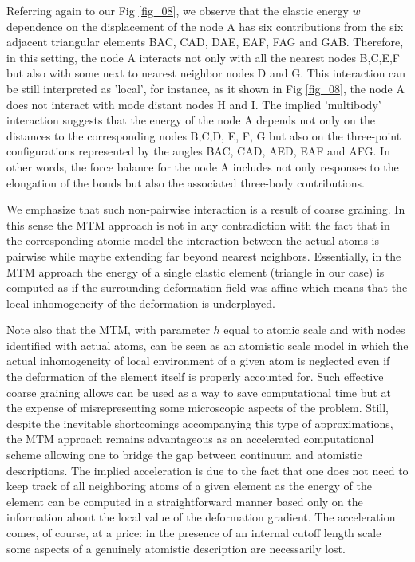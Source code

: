 \documentclass[aps,
superscriptaddress,notitlepage]{revtex4-1}
\begin{document}
Referring again to our Fig \ref{fig_08}, we observe that the elastic  energy $w$ dependence on the displacement of the node A has six contributions from the six adjacent triangular elements BAC, CAD, DAE, EAF, FAG and GAB. Therefore, in this setting,  the node A interacts  not only  with all the  nearest   nodes B,C,E,F but also with some next to nearest neighbor nodes D and G.   This interaction can be still interpreted as 'local', for instance, as it   shown in Fig \ref{fig_08},  the node A does not interact with  mode distant nodes H and I. 
 The implied  'multibody' interaction suggests  that the energy of the node A depends not only on the distances to the corresponding  nodes  B,C,D, E, F, G  but also on the three-point configurations represented by the angles BAC, CAD, AED, EAF and AFG. In other words, the   force balance  for the node A includes  not only responses to the  elongation of the bonds but also the associated  three-body contributions. 

We emphasize  that such non-pairwise  interaction is a result of coarse graining. In this sense the MTM  approach is not  in any  contradiction with the fact that in the corresponding atomic model  the interaction between the actual atoms is pairwise while maybe extending far beyond nearest neighbors. Essentially, in  the  MTM approach  the energy of a single  elastic element (triangle in our case)  is  computed as if the surrounding deformation field was affine which means that the local  inhomogeneity of the deformation is underplayed.   

Note also that the MTM, with parameter $h$   equal to atomic scale and with nodes identified with actual atoms,   can be seen as an atomistic scale model in which the actual inhomogeneity of local environment of a given atom  is neglected even if the deformation of the element itself is properly accounted for. Such effective coarse graining allows can be used as a way  to save computational time but at the expense of misrepresenting some microscopic aspects of the problem. Still, despite the inevitable shortcomings accompanying  this type of approximations, the  MTM approach remains advantageous as an accelerated computational scheme allowing one to bridge the gap between continuum and atomistic descriptions.  The implied  acceleration is due to the fact that   one does not need to keep track of  all neighboring atoms of a given element as the   energy of the element can be computed  in a straightforward  manner  based only on the information about  the local value of the deformation gradient.   The acceleration comes, of course, at a price: in the presence of an internal cutoff 
length scale some aspects of a genuinely atomistic description are necessarily lost. 
\end{document}
